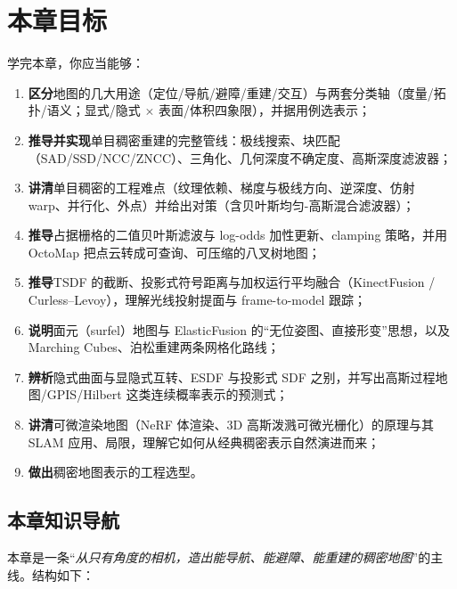 \section*{本章目标}
学完本章，你应当能够：
\begin{enumerate}
  \item \textbf{区分}地图的几大用途（定位/导航/避障/重建/交互）与两套分类轴（度量/拓扑/语义；显式/隐式 $\times$ 表面/体积四象限），并据用例选表示；
  \item \textbf{推导并实现}单目稠密重建的完整管线：极线搜索、块匹配（SAD/SSD/NCC/ZNCC）、三角化、几何深度不确定度、高斯深度滤波器；
  \item \textbf{讲清}单目稠密的工程难点（纹理依赖、梯度与极线方向、逆深度、仿射 warp、并行化、外点）并给出对策（含贝叶斯均匀-高斯混合滤波器）；
  \item \textbf{推导}占据栅格的二值贝叶斯滤波与 log-odds 加性更新、clamping 策略，并用 OctoMap 把点云转成可查询、可压缩的八叉树地图；
  \item \textbf{推导}TSDF 的截断、投影式符号距离与加权运行平均融合（KinectFusion / Curless--Levoy），理解光线投射提面与 frame-to-model 跟踪；
  \item \textbf{说明}面元（surfel）地图与 ElasticFusion 的“无位姿图、直接形变”思想，以及 Marching Cubes、泊松重建两条网格化路线；
  \item \textbf{辨析}隐式曲面与显隐式互转、ESDF 与投影式 SDF 之别，并写出高斯过程地图/GPIS/Hilbert 这类连续概率表示的预测式；
  \item \textbf{讲清}可微渲染地图（NeRF 体渲染、3D 高斯泼溅可微光栅化）的原理与其 SLAM 应用、局限，理解它如何从经典稠密表示自然演进而来；
  \item \textbf{做出}稠密地图表示的工程选型。
\end{enumerate}

\subsection*{本章知识导航}
本章是一条“\emph{从只有角度的相机，造出能导航、能避障、能重建的稠密地图}”的主线。结构如下：

